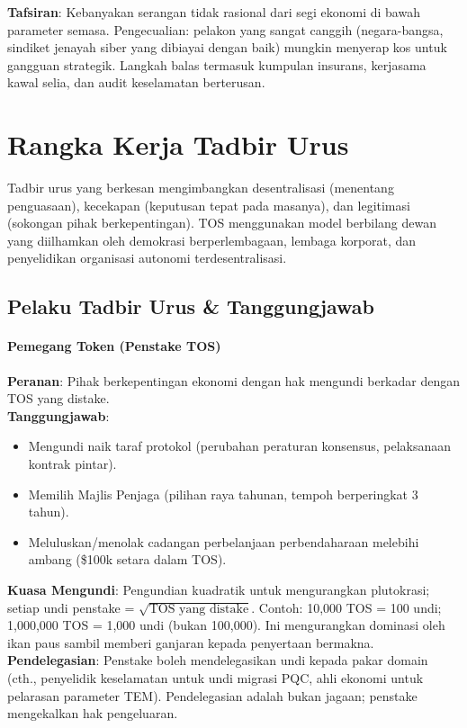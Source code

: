 \documentclass[11pt]{article}
\begin{document}
\textbf{Tafsiran}: Kebanyakan serangan tidak rasional dari segi ekonomi di bawah parameter semasa. Pengecualian: pelakon yang sangat canggih (negara-bangsa, sindiket jenayah siber yang dibiayai dengan baik) mungkin menyerap kos untuk gangguan strategik. Langkah balas termasuk kumpulan insurans, kerjasama kawal selia, dan audit keselamatan berterusan.

\section{Rangka Kerja Tadbir Urus}
\label{sec:governance}

Tadbir urus yang berkesan mengimbangkan desentralisasi (menentang penguasaan), kecekapan (keputusan tepat pada masanya), dan legitimasi (sokongan pihak berkepentingan). TOS menggunakan model berbilang dewan yang diilhamkan oleh demokrasi berperlembagaan, lembaga korporat, dan penyelidikan organisasi autonomi terdesentralisasi.

\subsection{Pelaku Tadbir Urus \& Tanggungjawab}

\paragraph{Pemegang Token (Penstake TOS)}
\textbf{Peranan}: Pihak berkepentingan ekonomi dengan hak mengundi berkadar dengan TOS yang distake.\\
\textbf{Tanggungjawab}:
\begin{itemize}[noitemsep]
  \item Mengundi naik taraf protokol (perubahan peraturan konsensus, pelaksanaan kontrak pintar).
  \item Memilih Majlis Penjaga (pilihan raya tahunan, tempoh berperingkat 3 tahun).
  \item Meluluskan/menolak cadangan perbelanjaan perbendaharaan melebihi ambang (\$100k setara dalam TOS).
\end{itemize}
\textbf{Kuasa Mengundi}: Pengundian kuadratik untuk mengurangkan plutokrasi; setiap undi penstake = $\sqrt{\text{TOS yang distake}}$. Contoh: 10,000 TOS = 100 undi; 1,000,000 TOS = 1,000 undi (bukan 100,000). Ini mengurangkan dominasi oleh ikan paus sambil memberi ganjaran kepada penyertaan bermakna.\\
\textbf{Pendelegasian}: Penstake boleh mendelegasikan undi kepada pakar domain (cth., penyelidik keselamatan untuk undi migrasi PQC, ahli ekonomi untuk pelarasan parameter TEM). Pendelegasian adalah bukan jagaan; penstake mengekalkan hak pengeluaran.
\end{document}
